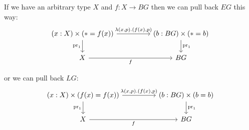 \documentclass[12pt]{extarticle}
\begin{document}
If we have an arbitrary type $X$ and $f:X\to BG$ then we can pull back $EG$ this way:
\[\begin{tikzcd}
	{(x:X)\times (*=f(x))} && {(b:BG)\times (*=b)} \\
	X && BG
	\arrow["{\mathrm{pr}_1}", from=1-3, to=2-3]
	\arrow["{\lambda(x, p).(f(x),p)}", from=1-1, to=1-3]
	\arrow["f"', from=2-1, to=2-3]
	\arrow["{\mathrm{pr}_1}"', from=1-1, to=2-1]
\end{tikzcd}\]

or we can pull back $LG$:
\[\begin{tikzcd}
	{(x:X)\times (f(x)=f(x))} && {(b:BG)\times (b=b)} \\
	X && BG
	\arrow["{\mathrm{pr}_1}", from=1-3, to=2-3]
	\arrow["{\lambda(x, p).(f(x),p)}", from=1-1, to=1-3]
	\arrow["f"', from=2-1, to=2-3]
	\arrow["{\mathrm{pr}_1}"', from=1-1, to=2-1]
\end{tikzcd}\]


\end{document}
